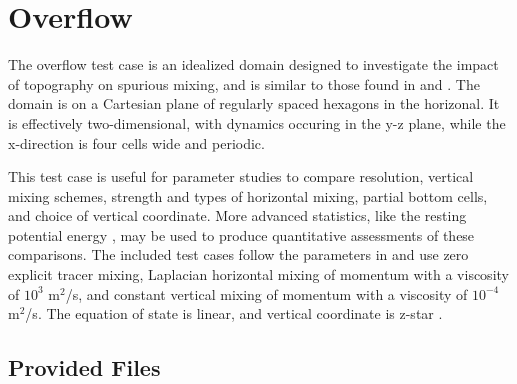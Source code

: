 \section{Overflow}
\label{sec:overflow_description}
The overflow test case is an idealized domain designed to investigate the impact of topography on spurious mixing, and is similar to those found in \citet{Haidvogel_Beckmann99bk} and \citet[section 4]{Ilicak_ea12om}.  The domain is on a Cartesian plane of regularly spaced hexagons in the horizonal.  It is effectively two-dimensional, with dynamics occuring in the y-z plane, while the x-direction is four cells wide and periodic.  

This test case is useful for parameter studies to compare resolution, vertical mixing schemes, strength and types of horizontal mixing, partial bottom cells, and choice of vertical coordinate.  More advanced statistics, like the resting potential energy \citep{Ilicak_ea12om}, may be used to produce quantitative assessments of these comparisons.  The included test cases follow the parameters in \citet[section 4]{Ilicak_ea12om} and use zero explicit tracer mixing, Laplacian horizontal mixing of momentum with a viscosity of $10^3$ m$^2$/s, and constant vertical mixing of momentum with a viscosity of $10^{-4}$ m$^2$/s.  The equation of state is linear, and vertical coordinate is z-star \citep{Adcroft_Campin04om}.


\subsection{Provided Files}
\label{subsec:overflow_files}

